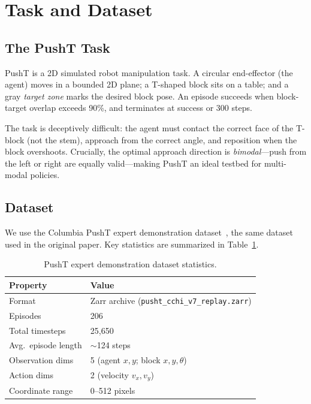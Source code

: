 \documentclass[10pt,letterpaper]{article}
\begin{document}
\section{Task and Dataset}

\subsection{The PushT Task}

PushT is a 2D simulated robot manipulation task.
A circular end-effector (the agent) moves in a bounded 2D plane;
a T-shaped block sits on a table; and a gray \textit{target zone} marks the
desired block pose.
An episode succeeds when block-target overlap exceeds 90\%, and terminates at
success or 300 steps.

The task is deceptively difficult: the agent must contact the correct face of the
T-block (not the stem), approach from the correct angle, and reposition when the
block overshoots.
Crucially, the optimal approach direction is \emph{bimodal}---push from the left or
right are equally valid---making PushT an ideal testbed for multi-modal policies.

\subsection{Dataset}

We use the Columbia PushT expert demonstration dataset~\citep{chi2023diffusion},
the same dataset used in the original paper.
Key statistics are summarized in Table~\ref{tab:dataset}.

\begin{table}[h]
  \centering
  \caption{PushT expert demonstration dataset statistics.}
  \label{tab:dataset}
  \small
  \begin{tabular}{@{}ll@{}}
    \toprule
    \textbf{Property} & \textbf{Value} \\
    \midrule
    Format            & Zarr archive (\texttt{pusht\_cchi\_v7\_replay.zarr}) \\
    Episodes          & 206 \\
    Total timesteps   & 25,650 \\
    Avg.\ episode length & $\sim$124 steps \\
    Observation dims  & 5 (agent $x,y$; block $x,y,\theta$) \\
    Action dims       & 2 (velocity $v_x, v_y$) \\
    Coordinate range  & 0--512 pixels \\
    \bottomrule
  \end{tabular}
\end{table}
\end{document}

